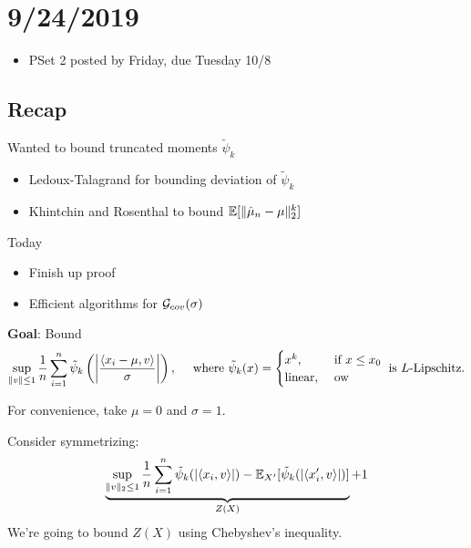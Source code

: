 \section{9/24/2019}

\begin{itemize}
  \item PSet 2 posted by Friday, due Tuesday 10/8
\end{itemize}

\subsection{Recap}%

Wanted to bound truncated moments $\tilde{\psi}_k$
\begin{itemize}
  \item Ledoux-Talagrand for bounding deviation of $\tilde{\psi}_k$
  \item Khintchin and Rosenthal to bound $\mathbb{E}[\|\hat\mu_n - \mu\|_2^k]$
\end{itemize}

Today
\begin{itemize}
  \item Finish up proof
  \item Efficient algorithms for $\mathcal{G}_{cov}(\sigma)$
\end{itemize}

\textbf{Goal}: Bound
\begin{align}
  \sup_{\|v\| \leq 1} \frac{1}{n}
  \sum_{i=1}^n \tilde{\psi}_k\left(\left\lvert \frac{\braket{x_i - \mu, v}}{\sigma}\right\rvert\right),
  \quad\text{ where }
  \tilde{\psi}_k(x) = \begin{cases}
    x^k, &\text{ if }x \leq x_0\\
    \text{linear}, &\text{ ow }
  \end{cases}
  \text{ is $L$-Lipschitz.}
\end{align}

For convenience, take $\mu = 0$ and $\sigma = 1$.

Consider symmetrizing:
\begin{align}
  \underbrace{\sup_{\|v\|_2 \leq 1} \frac{1}{n} \sum_{i=1}^n \tilde{\psi}_k(\lvert \braket{x_i, v}\rvert) - \mathbb{E}_{X'}[\tilde{\psi}_k(\lvert \braket{x_i', v}\rvert)]}_{Z(X)} + 1
\end{align}
We're going to bound $Z(X)$ using Chebyshev's inequality.

